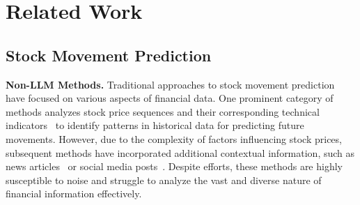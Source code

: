 \section{Related Work}

\subsection{Stock Movement Prediction}
\textbf{Non-LLM Methods.}
Traditional approaches to stock movement prediction have focused on various aspects of financial data. One prominent category of methods analyzes stock price sequences and their corresponding technical indicators~\citep{qin2017dual,feng2018enhancing} to identify patterns in historical data for predicting future movements. However, due to the complexity of factors influencing stock prices, subsequent methods have incorporated additional contextual information, such as news articles~\citep{ding2015deep,liu2018hierarchical}  or social media posts~\citep{xu2018stock,wu2018hybrid}. Despite efforts, these methods are highly susceptible to noise and struggle to analyze the vast and diverse nature of financial information effectively.

